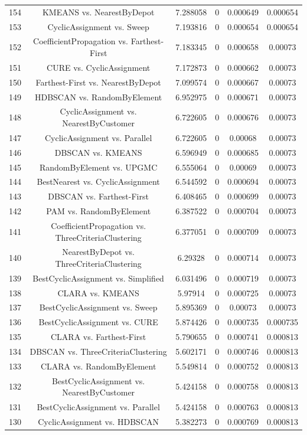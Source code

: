 \documentclass[a4paper,10pt]{article}
\begin{document}
\begin{landscape}
\begin{table}[!htp]
\begin{tabular}{cccccc}
154&KMEANS vs. NearestByDepot&7.288058&0&0.000649&0.000654\\
153&CyclicAssignment vs. Sweep&7.193816&0&0.000654&0.000654\\
152&CoefficientPropagation vs. Farthest-First&7.183345&0&0.000658&0.00073\\
151&CURE vs. CyclicAssignment&7.172873&0&0.000662&0.00073\\
150&Farthest-First vs. NearestByDepot&7.099574&0&0.000667&0.00073\\
149&HDBSCAN vs. RandomByElement&6.952975&0&0.000671&0.00073\\
148&CyclicAssignment vs. NearestByCustomer&6.722605&0&0.000676&0.00073\\
147&CyclicAssignment vs. Parallel&6.722605&0&0.00068&0.00073\\
146&DBSCAN vs. KMEANS&6.596949&0&0.000685&0.00073\\
145&RandomByElement vs. UPGMC&6.555064&0&0.00069&0.00073\\
144&BestNearest vs. CyclicAssignment&6.544592&0&0.000694&0.00073\\
143&DBSCAN vs. Farthest-First&6.408465&0&0.000699&0.00073\\
142&PAM vs. RandomByElement&6.387522&0&0.000704&0.00073\\
141&CoefficientPropagation vs. ThreeCriteriaClustering&6.377051&0&0.000709&0.00073\\
140&NearestByDepot vs. ThreeCriteriaClustering&6.29328&0&0.000714&0.00073\\
139&BestCyclicAssignment vs. Simplified&6.031496&0&0.000719&0.00073\\
138&CLARA vs. KMEANS&5.97914&0&0.000725&0.00073\\
137&BestCyclicAssignment vs. Sweep&5.895369&0&0.00073&0.00073\\
136&BestCyclicAssignment vs. CURE&5.874426&0&0.000735&0.000735\\
135&CLARA vs. Farthest-First&5.790655&0&0.000741&0.000813\\
134&DBSCAN vs. ThreeCriteriaClustering&5.602171&0&0.000746&0.000813\\
133&CLARA vs. RandomByElement&5.549814&0&0.000752&0.000813\\
132&BestCyclicAssignment vs. NearestByCustomer&5.424158&0&0.000758&0.000813\\
131&BestCyclicAssignment vs. Parallel&5.424158&0&0.000763&0.000813\\
130&CyclicAssignment vs. HDBSCAN&5.382273&0&0.000769&0.000813\\

\end{tabular}
\end{table}
\end{landscape}
\end{document}
